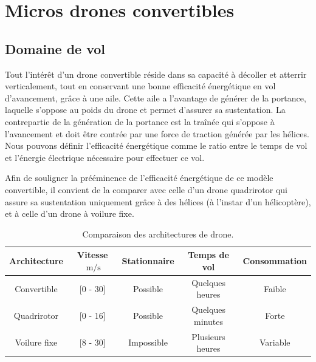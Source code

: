 \section{Micros drones convertibles}

    \subsection{Domaine de vol} 
    Tout l'intérêt d'un drone convertible réside dans sa capacité à décoller et atterrir verticalement, tout en conservant une bonne efficacité énergétique en vol d'avancement, grâce à une aile. Cette aile a l'avantage de générer de la portance, laquelle s'oppose au poids du drone et permet d'assurer sa sustentation. La contrepartie de la génération de la portance est la traînée qui s'oppose à l'avancement et doit être contrée par une force de traction générée par les hélices. Nous pouvons définir l'efficacité énergétique comme le ratio entre le temps de vol et l'énergie électrique nécessaire pour effectuer ce vol.
    
    Afin de souligner la prééminence de l'efficacité énergétique de ce modèle convertible, il convient de la comparer avec celle d'un drone quadrirotor qui assure sa sustentation uniquement grâce à des hélices (à l'instar d'un hélicoptère), et à celle d'un drone à voilure fixe.
    \begin{table}[ht]
        \centering
        \begin{tabular}{|c|c|c|c|c|}
            \hline
            Architecture & Vitesse $\SI{}{\meter\per\second}$  & Stationnaire & Temps de vol & Consommation\\
            \hline \hline
            Convertible & [0 - 30] & Possible & Quelques heures & Faible\\
            \hline
            Quadrirotor & [0 - 16] & Possible& Quelques minutes & Forte\\
            \hline
            Voilure fixe & [8 - 30] & Impossible & Plusieurs heures & Variable \\
            \hline
        \end{tabular}
        \caption{Comparaison des architectures de drone.}
    \end{table}

